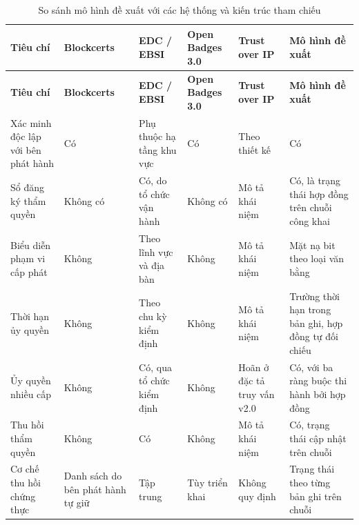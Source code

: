 \begingroup
\footnotesize
\setlength{\tabcolsep}{3pt}
\begin{longtable}{|>{\raggedright\arraybackslash}p{2.8cm}|>{\raggedright\arraybackslash}p{2.4cm}|>{\raggedright\arraybackslash}p{2.5cm}|>{\raggedright\arraybackslash}p{2.3cm}|>{\raggedright\arraybackslash}p{2.3cm}|>{\raggedright\arraybackslash}p{2.3cm}|}
\caption{So sánh mô hình đề xuất với các hệ thống và kiến trúc tham chiếu}
\label{tab:system-comparison} \\

\hline
\textbf{Tiêu chí} & \textbf{Blockcerts} & \textbf{EDC / EBSI} & \textbf{Open Badges 3.0} & \textbf{Trust over IP} & \textbf{Mô hình đề xuất} \\
\hline
\endfirsthead

\hline
\textbf{Tiêu chí} & \textbf{Blockcerts} & \textbf{EDC / EBSI} & \textbf{Open Badges 3.0} & \textbf{Trust over IP} & \textbf{Mô hình đề xuất} \\
\hline
\endhead

\hline
\endfoot

\hline
\endlastfoot

Xác minh độc lập với bên phát hành
& Có
& Phụ thuộc hạ tầng khu vực
& Có
& Theo thiết kế
& Có
\\ \hline

Sổ đăng ký thẩm quyền
& Không có
& Có, do tổ chức vận hành
& Không có
& Mô tả khái niệm
& Có, là trạng thái hợp đồng trên chuỗi công khai
\\ \hline

Biểu diễn phạm vi cấp phát
& Không
& Theo lĩnh vực và địa bàn
& Không
& Mô tả khái niệm
& Mặt nạ bit theo loại văn bằng
\\ \hline

Thời hạn ủy quyền
& Không
& Theo chu kỳ kiểm định
& Không
& Mô tả khái niệm
& Trường thời hạn trong bản ghi, hợp đồng tự đối chiếu
\\ \hline

Ủy quyền nhiều cấp
& Không
& Có, qua tổ chức kiểm định
& Không
& Hoãn ở đặc tả truy vấn v2.0
& Có, với ba ràng buộc thi hành bởi hợp đồng
\\ \hline

Thu hồi thẩm quyền
& Không
& Có
& Không
& Mô tả khái niệm
& Có, trạng thái cập nhật trên chuỗi
\\ \hline

Cơ chế thu hồi chứng thực
& Danh sách do bên phát hành tự giữ
& Tập trung
& Tùy triển khai
& Không quy định
& Trạng thái theo từng bản ghi trên chuỗi
\\ \hline


\end{longtable}
